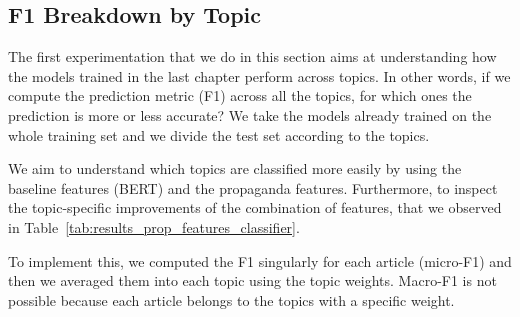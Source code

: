 \subsection{\statusgreen F1 Breakdown by Topic}
\label{sec:topic_classifier_propaganda_f1_across}

The first experimentation that we do in this section aims at understanding how the models trained in the last chapter perform across topics.
In other words, if we compute the prediction metric (F1) across all the topics, for which ones the prediction is more or less accurate?
We take the models already trained on the whole training set and we divide the test set according to the topics.

We aim to understand which topics are classified more easily by using the baseline features (BERT) and the propaganda features. Furthermore, to inspect the topic-specific improvements of the combination of features, that we observed in Table~\ref{tab:results_prop_features_classifier}. 

To implement this, we computed the F1 singularly for each article (micro-F1) and then we averaged them into each topic using the topic weights. Macro-F1 is not possible because each article belongs to the topics with a specific weight.

